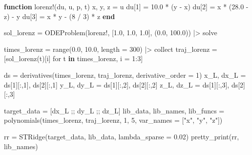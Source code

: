 \documentclass[
]{article}
\newenvironment{Shaded}{\begin{snugshade}}{\end{snugshade}}
\newcommand{\FloatTok}[1]{\textcolor[rgb]{0.68,0.00,0.00}{#1}}
\newcommand{\FunctionTok}[1]{\textcolor[rgb]{0.28,0.35,0.67}{#1}}
\newcommand{\KeywordTok}[1]{\textcolor[rgb]{0.00,0.23,0.31}{\textbf{#1}}}
\newcommand{\NormalTok}[1]{\textcolor[rgb]{0.00,0.23,0.31}{#1}}
\newcommand{\OperatorTok}[1]{\textcolor[rgb]{0.37,0.37,0.37}{#1}}
\newcommand{\StringTok}[1]{\textcolor[rgb]{0.13,0.47,0.30}{#1}}
\begin{document}
\begin{Shaded}
\begin{Highlighting}[]
\KeywordTok{function} \FunctionTok{lorenz!}\NormalTok{(du, u, p, t)}
\NormalTok{    x, y, z }\OperatorTok{=}\NormalTok{ u}
\NormalTok{    du[}\FloatTok{1}\NormalTok{] }\OperatorTok{=} \FloatTok{10.0} \OperatorTok{*}\NormalTok{ (y }\OperatorTok{{-}}\NormalTok{ x)}
\NormalTok{    du[}\FloatTok{2}\NormalTok{] }\OperatorTok{=}\NormalTok{ x }\OperatorTok{*}\NormalTok{ (}\FloatTok{28.0} \OperatorTok{{-}}\NormalTok{ z) }\OperatorTok{{-}}\NormalTok{ y}
\NormalTok{    du[}\FloatTok{3}\NormalTok{] }\OperatorTok{=}\NormalTok{ x }\OperatorTok{*}\NormalTok{ y }\OperatorTok{{-}}\NormalTok{ (}\FloatTok{8} \OperatorTok{/} \FloatTok{3}\NormalTok{) }\OperatorTok{*}\NormalTok{ z}
\KeywordTok{end}

\NormalTok{sol\_lorenz }\OperatorTok{=} \FunctionTok{ODEProblem}\NormalTok{(lorenz!, [}\FloatTok{1.0}\NormalTok{, }\FloatTok{1.0}\NormalTok{, }\FloatTok{1.0}\NormalTok{], (}\FloatTok{0.0}\NormalTok{, }\FloatTok{100.0}\NormalTok{)) }\OperatorTok{|\textgreater{}}\NormalTok{ solve}

\NormalTok{times\_lorenz }\OperatorTok{=} \FunctionTok{range}\NormalTok{(}\FloatTok{0.0}\NormalTok{, }\FloatTok{10.0}\NormalTok{, length }\OperatorTok{=} \FloatTok{300}\NormalTok{) }\OperatorTok{|\textgreater{}}\NormalTok{ collect}
\NormalTok{traj\_lorenz }\OperatorTok{=}\NormalTok{ [}\FunctionTok{sol\_lorenz}\NormalTok{(t)[i] for t }\KeywordTok{in}\NormalTok{ times\_lorenz, i }\OperatorTok{=} \FloatTok{1}\OperatorTok{:}\FloatTok{3}\NormalTok{]}

\NormalTok{ds }\OperatorTok{=} \FunctionTok{derivatives}\NormalTok{(times\_lorenz, traj\_lorenz, derivative\_order }\OperatorTok{=} \FloatTok{1}\NormalTok{)}
\NormalTok{x\_L, dx\_L }\OperatorTok{=}\NormalTok{ ds[}\FloatTok{1}\NormalTok{][}\OperatorTok{:}\NormalTok{,}\FloatTok{1}\NormalTok{], ds[}\FloatTok{2}\NormalTok{][}\OperatorTok{:}\NormalTok{,}\FloatTok{1}\NormalTok{]}
\NormalTok{y\_L, dy\_L }\OperatorTok{=}\NormalTok{ ds[}\FloatTok{1}\NormalTok{][}\OperatorTok{:}\NormalTok{,}\FloatTok{2}\NormalTok{], ds[}\FloatTok{2}\NormalTok{][}\OperatorTok{:}\NormalTok{,}\FloatTok{2}\NormalTok{]}
\NormalTok{z\_L, dz\_L }\OperatorTok{=}\NormalTok{ ds[}\FloatTok{1}\NormalTok{][}\OperatorTok{:}\NormalTok{,}\FloatTok{3}\NormalTok{], ds[}\FloatTok{2}\NormalTok{][}\OperatorTok{:}\NormalTok{,}\FloatTok{3}\NormalTok{]}

\NormalTok{target\_data }\OperatorTok{=}\NormalTok{ [dx\_L ;; dy\_L ;; dz\_L]}
\NormalTok{lib\_data, lib\_names, lib\_funcs }\OperatorTok{=} \FunctionTok{polynomials}\NormalTok{(times\_lorenz, traj\_lorenz, }\FloatTok{1}\NormalTok{, }\FloatTok{5}\NormalTok{, var\_names }\OperatorTok{=}\NormalTok{ [}\StringTok{"x"}\NormalTok{, }\StringTok{"y"}\NormalTok{, }\StringTok{"z"}\NormalTok{])}

\NormalTok{rr }\OperatorTok{=} \FunctionTok{STRidge}\NormalTok{(target\_data, lib\_data, lambda\_sparse }\OperatorTok{=} \FloatTok{0.02}\NormalTok{)}
\FunctionTok{pretty\_print}\NormalTok{(rr, lib\_names)}
\end{Highlighting}
\end{Shaded}
\end{document}
